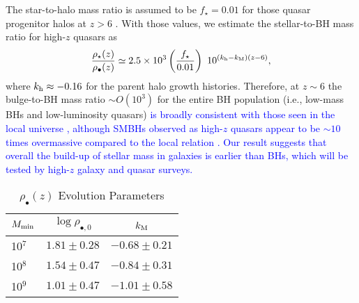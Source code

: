 \documentclass[twocolumn, twocolappendix]{aastex63}
\newcommand{\Mh}{M_\mathrm{h}}
\newcommand{\D}{\mathrm{d}}
\newcommand{\red}[1]{\textcolor{red}{ #1}}
\newcommand{\blue}[1]{\textcolor{blue}{ #1}}
\begin{document}
\begin{CJK*}{UTF8}{gbsn}
The star-to-halo mass ratio is assumed to be $f_\star =0.01$ for those quasar progenitor halos at $z>6$
\citep[fits by code {\tt UNIVERSEMACHINE} in][]{2019MNRAS.488.3143B}.
With those values, we estimate the stellar-to-BH mass ratio for high-$z$ quasars as
%
\begin{equation}
\frac{\rho_{\star}(z)}{\rho_{\bullet}(z)}
\simeq 2.5\times 10^{3} \left(\frac{f_\star}{0.01}\right)
~ 10^{(k_{\rm h}-k_{\rm M})(z-6)},
\end{equation}
% 
where $k_{\rm h} \approx -0.16 $ for the parent halo growth histories.
Therefore, at $z\sim 6$ the bulge-to-BH mass ratio $\sim O(10^3)$ for the entire BH population (i.e., low-mass BHs and low-luminosity quasars) 
\blue{
is broadly consistent with those seen in the local universe \citep[$\simeq 200-1000$ in e.g.,][]{2012ApJ...751L..25V,2013ARA&A..51..511K},
although SMBHs observed as high-$z$ quasars appear to be $\sim 10$ times overmassive compared to the local relation 
\citep[e.g.,][]{2013ApJ...773...44W,2020A&A...637A..84P,2021ApJ...911..141N}.
Our result suggests that overall the build-up of stellar mass in galaxies is earlier than BHs,
which will be tested by high-$z$ galaxy and quasar surveys.
}

\begin{table}
\renewcommand\thetable{1} %
\caption{$\rho_\bullet(z)$ Evolution Parameters}
\begin{center}
\begin{tabular}{l c r}
\hline
\hline
$M_{\rm min}$ & $\log \rho_{\bullet,0}$ & $k_{\rm M}$ ~~~ \\ 
\hline 
10$^7$  &  $ 1.81\pm 0.28$  &  $-0.68 \pm 0.21$  \\
10$^8$  &  $ 1.54\pm 0.47$  &  $-0.84 \pm 0.31$  \\
10$^9$  &  $ 1.01\pm 0.47$  &  $-1.01 \pm 0.58$ \\
\hline 
\end{tabular}
\label{tab:MFz}
\end{center}
\end{table}    



\end{CJK*}
\end{document}
